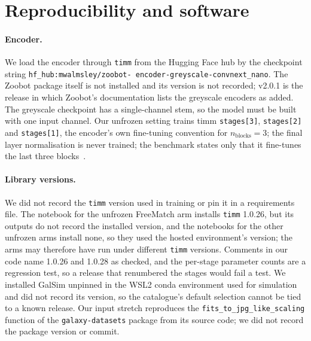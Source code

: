 \section{Reproducibility and software}
\label{app:repro}

\paragraph{Encoder.} We load the encoder through \texttt{timm} from the Hugging Face hub by the
checkpoint string \texttt{hf\_hub:\allowbreak mwalmsley/\allowbreak zoobot-\allowbreak
encoder-\allowbreak greyscale-\allowbreak convnext\_nano}. The Zoobot package itself is not
installed and its version is not recorded; v2.0.1 is the release in which Zoobot's
documentation lists the greyscale encoders as added. The greyscale checkpoint has a
single-channel stem, so the model must be built with one input channel. Our unfrozen setting
trains timm \texttt{stages[3]}, \texttt{stages[2]} and \texttt{stages[1]}, the encoder's own
fine-tuning convention for $n_{\mathrm{blocks}} = 3$; the final layer normalisation is never
trained; the benchmark states only that it fine-tunes the last three
blocks~\citep{lines2025simstosky}.

\paragraph{Library versions.} We did not record the \texttt{timm} version used in training or
pin it in a requirements file. The notebook for the unfrozen FreeMatch arm installs
\texttt{timm} 1.0.26, but its outputs do not record the installed version, and the notebooks
for the other unfrozen arms install none, so they used the hosted environment's version; the
arms may therefore have run under different \texttt{timm} versions. Comments in our code name
1.0.26 and 1.0.28 as checked, and the per-stage parameter counts are a regression test, so a
release that renumbered the stages would fail a test. We installed GalSim unpinned in the WSL2
conda environment used for simulation and did not record its version, so the catalogue's default selection cannot be tied to
a known release. Our input stretch reproduces the \texttt{fits\_to\_jpg\_like\_scaling}
function of the \texttt{galaxy-datasets} package from its source code; we did not record the
package version or commit.

